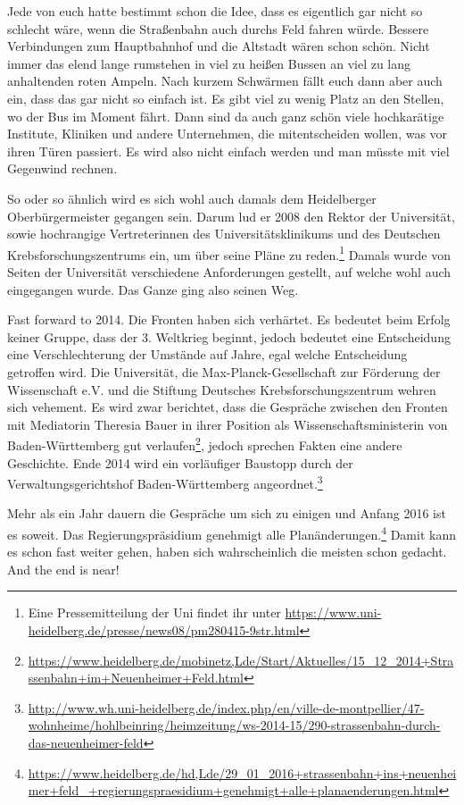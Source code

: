 Jede von euch hatte bestimmt schon die Idee, dass es eigentlich gar nicht so schlecht wäre, wenn die Straßenbahn auch durchs Feld fahren würde. Bessere Verbindungen zum Hauptbahnhof und die Altstadt wären schon schön. Nicht immer das elend lange rumstehen in viel zu heißen Bussen an viel zu lang anhaltenden roten Ampeln. Nach kurzem Schwärmen fällt euch dann aber auch ein, dass das gar nicht so einfach ist. Es gibt viel zu wenig Platz an den Stellen, wo der Bus im Moment fährt. Dann sind da auch ganz schön viele hochkarätige Institute, Kliniken und andere Unternehmen, die mitentscheiden wollen, was vor ihren Türen passiert. Es wird also nicht einfach werden und man müsste mit viel Gegenwind rechnen.

So oder so ähnlich wird es sich wohl auch damals dem Heidelberger Oberbürgermeister gegangen sein. Darum lud er 2008 den Rektor der Universität, sowie hochrangige Vertreterinnen des Universitätsklinikums und des Deutschen Krebsforschungszentrums ein, um über seine Pläne zu reden.\footnote{Eine Pressemitteilung der Uni findet ihr unter \url{https://www.uni-heidelberg.de/presse/news08/pm280415-9str.html}} Damals wurde von Seiten der Universität verschiedene Anforderungen gestellt, auf welche wohl auch eingegangen wurde. Das Ganze ging also seinen Weg.

Fast forward to 2014. Die Fronten haben sich verhärtet. Es bedeutet beim Erfolg keiner Gruppe, dass der 3. Weltkrieg beginnt, jedoch bedeutet eine Entscheidung eine Verschlechterung der Umstände auf Jahre, egal welche Entscheidung getroffen wird. Die Universität, die Max-Planck-Gesellschaft zur Förderung der Wissenschaft e.V. und die Stiftung Deutsches Krebsforschungszentrum wehren sich vehement. Es wird zwar berichtet, dass die Gespräche zwischen den Fronten mit Mediatorin Theresia Bauer in ihrer Position als Wissenschaftsministerin von Baden-Württemberg gut verlaufen\footnote{\url{https://www.heidelberg.de/mobinetz,Lde/Start/Aktuelles/15_12_2014+Strassenbahn+im+Neuenheimer+Feld.html}}, jedoch sprechen Fakten eine andere Geschichte. Ende 2014 wird ein vorläufiger Baustopp durch der Verwaltungsgerichtshof Baden-Württemberg angeordnet.\footnote{\url{http://www.wh.uni-heidelberg.de/index.php/en/ville-de-montpellier/47-wohnheime/hohlbeinring/heimzeitung/ws-2014-15/290-strassenbahn-durch-das-neuenheimer-feld}}

Mehr als ein Jahr dauern die Gespräche um sich zu einigen und Anfang 2016 ist es soweit. Das Regierungspräsidium genehmigt alle Planänderungen.\footnote{\url{https://www.heidelberg.de/hd,Lde/29_01_2016+strassenbahn+ins+neuenheimer+feld_+regierungspraesidium+genehmigt+alle+planaenderungen.html}} Damit kann es schon fast weiter gehen, haben sich wahrscheinlich die meisten schon gedacht. And the end is near!

